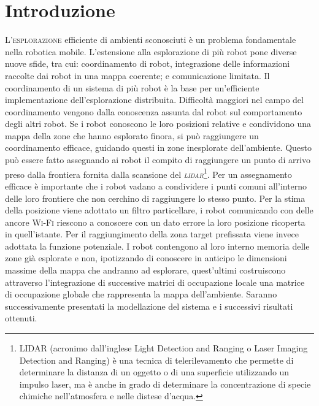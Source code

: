 \section{Introduzione}
\lettrine[lines=3]{L'}{esplorazione} efficiente di ambienti sconosciuti è un 
problema fondamentale nella robotica mobile. 
L'estensione alla esplorazione di più robot pone diverse nuove sfide, tra cui: 
coordinamento di robot, integrazione delle informazioni raccolte dai robot in
una mappa coerente; e comunicazione limitata.
Il coordinamento di un sistema di più robot è la base per un'efficiente 
implementazione dell'esplorazione distribuita. 
Difficoltà maggiori nel campo del coordinamento vengono dalla conoscenza 
assunta dal robot sul comportamento degli altri robot. 
Se i robot conoscono le loro posizioni relative e condividono una mappa della 
zone che hanno esplorato finora, si può raggiungere un coordinamento efficace,
guidando questi in zone inesplorate dell'ambiente.
Questo può essere fatto assegnando ai robot il compito di raggiungere un punto 
di arrivo preso dalla frontiera fornita dalla scansione del 
\emph{\textsc{lidar}}\footnote{LIDAR (acronimo dall'inglese Light Detection and 
Ranging o Laser Imaging Detection and Ranging) è una tecnica di 
telerilevamento che permette di determinare la distanza di un oggetto o di una 
superficie utilizzando un impulso laser, ma è anche in grado di determinare la
concentrazione di specie chimiche nell'atmosfera e nelle distese d'acqua.}.\cite{yamauchi1998frontier}
Per un assegnamento efficace è importante che i robot vadano a condividere i 
punti comuni all'interno delle loro frontiere che non cerchino di raggiungere 
lo stesso punto.
Per la stima della posizione viene adottato un filtro particellare, i robot 
comunicando con delle ancore \textsc{Wi-Fi} riescono a conoscere con un dato 
errore la loro posizione ricoperta in quell'istante. Per il raggiungimento 
della zona target prefissata viene invece adottata la funzione potenziale.
I robot contengono al loro interno memoria delle zone già esplorate e non, 
ipotizzando di conoscere in anticipo le dimensioni massime della mappa che 
andranno ad esplorare, quest'ultimi costruiscono attraverso l'integrazione di 
successive matrici di occupazione locale una matrice di occupazione globale 
che rappresenta la mappa dell'ambiente.
Saranno successivamente presentati la modellazione del sistema e i successivi 
risultati ottenuti.
